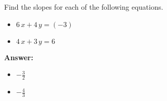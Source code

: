  Find the slopes for each of the following equations. \begin{itemize}\item \( 6 \, x + 4 \, y = \left(-3\right) \)\item \( 4 \, x + 3 \, y = 6 \)\end{itemize}

        \textbf{Answer:} \begin{itemize}\item \( -\frac{3}{2} \)\item \( -\frac{4}{3} \)\end{itemize}
